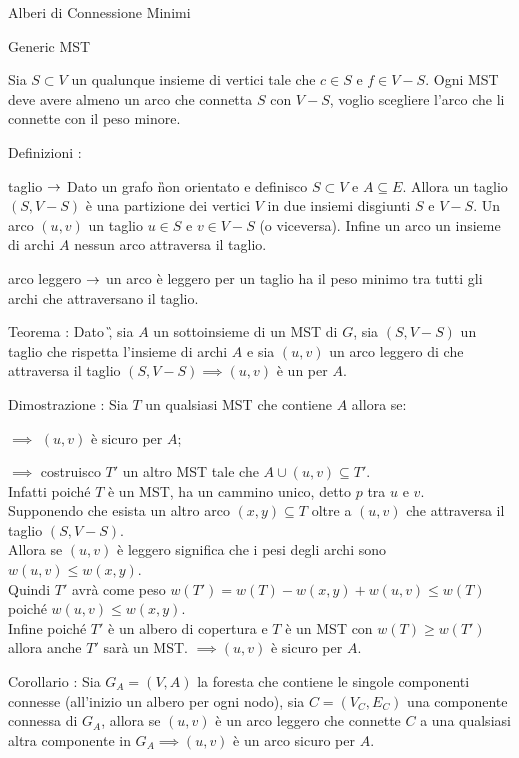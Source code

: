 \documentclass[8pt]{extarticle}
\begin{document}
\begin{formulario}
\begin{myParagraphEnd}{Alberi di Connessione Minimi}
\begin{subParagraph}{Generic MST}
\begin{Descr}
Sia $S\subset V$ un qualunque insieme di vertici tale che $c\in S$ e $f\in V-S$. Ogni MST deve avere almeno un arco che connetta $S$ con $V-S$, voglio scegliere l'arco che li connette con il peso minore.
				\item[Definizioni]:\\
				\begin{Descr} 
					\item[taglio] $\rightarrow$ Dato un grafo \G non orientato e definisco $S\subset V$ e $A\subseteq E$. Allora un taglio $(S,V-S)$ è una partizione dei vertici $V$ in due insiemi disgiunti $S$ e $V-S$. Un arco $(u,v)$  un taglio \SSE $u\in S$ e $v\in V-S$ (o viceversa). Infine un arco  un insieme di archi $A$ \SSE nessun arco attraversa il taglio. 
					\item[arco leggero] $\rightarrow$ un arco è leggero per un taglio \SSE ha il peso minimo tra tutti gli archi che attraversano il taglio.
				\end{Descr}
				\item[Teorema]: Dato \G, sia $A$ un sottoinsieme di un MST di $G$, sia $(S,V-S)$ un taglio che rispetta l'insieme di archi $A$ e sia $(u,v)$ un arco leggero di che attraversa il taglio $(S,V-S)\implies (u,v)$ è un \bo{arco sicuro} per $A$.
				\item[Dimostrazione]: Sia $T$ un qualsiasi MST che contiene $A$ allora se:
				\begin{Descr} 
					\item[\bm{$(u,v)\subseteq T$}] $\implies$ $(u,v)$ è sicuro per $A$; 
					\item[\bm{$(u,v)\not\subseteq T$}] $\implies$ costruisco $T'$ un altro MST tale che $A\cup (u,v)\subseteq T'$.\\	
					Infatti poiché $T$ è un MST, ha un cammino unico, detto $p$ tra $u$ e $v$. \\
					Supponendo che esista un altro arco $(x,y)\subseteq T$ oltre a $(u,v)$ che attraversa il taglio $(S,V-S)$. \\
					Allora se $(u,v)$ è leggero significa che i pesi degli archi sono $w(u,v)\leq w(x,y)$. \\
					Quindi $T'$ avrà come peso $w(T')=w(T)-w(x,y)+w(u,v)\leq w(T)$ poiché $w(u,v)\leq w(x,y)$. \\
					Infine poiché $T'$ è un albero di copertura e $T$ è un MST con $w(T)\geq w(T')$ allora anche $T'$ sarà un MST.
					$\implies (u,v)$ è sicuro per $A$.
				\end{Descr} 
				\item[Corollario]: Sia $G_A=(V,A)$ la foresta che contiene le singole componenti connesse (all'inizio un albero per ogni nodo), sia $C=(V_C,E_C)$ una componente connessa di $G_A$, allora se $(u,v)$ è un arco leggero che connette $C$ a una qualsiasi altra componente in $G_A\implies(u,v)$ è un arco sicuro per $A$.

\end{Descr}
\end{subParagraph}
\end{myParagraphEnd}
\end{formulario}
\end{document}
